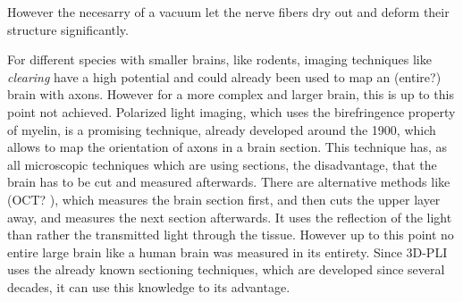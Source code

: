 However the necesarry of a vacuum let the nerve fibers dry out and deform their structure significantly.
\par
% 
For different species with smaller brains, like rodents, imaging techniques like \textit{clearing} have a high potential and could already been used to map an (entire?) brain with axons.
However for a more complex and larger brain, this is up to this point not achieved.
Polarized light imaging, which uses the birefringence property of myelin, is a promising technique, already developed around the 1900, which allows to map the orientation of axons in a brain section.
This technique has, as all microscopic techniques which are using sections, the disadvantage, that the brain has to be cut and measured afterwards.
There are alternative methods like (OCT? \cite{Aumann2019}), which measures the brain section first, and then cuts the upper layer away, and measures the next section afterwards. It uses the reflection of the light than rather the transmitted light through the tissue.
However up to this point no entire large brain like a human brain was measured in its entirety.
Since \ac{3D-PLI} uses the already known sectioning techniques, which are developed since several decades, it can use this knowledge to its advantage.
% 
%
